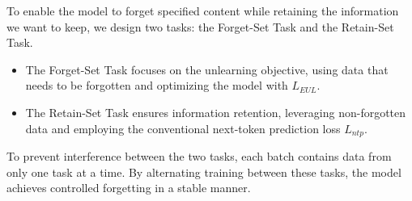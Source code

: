 \documentclass[11pt]{article}
\begin{document}


To enable the model to forget specified content while retaining the information we want to keep, we design two tasks: the Forget-Set Task and the Retain-Set Task.
\begin{itemize}
	\item The Forget-Set Task focuses on the unlearning objective, using data that needs to be forgotten and optimizing the model with $L_{EUL}$.
	\item The Retain-Set Task ensures information retention, leveraging non-forgotten data and employing the conventional next-token prediction loss $L_{ntp}$.
\end{itemize}


To prevent interference between the two tasks, each batch contains data from only one task at a time. By alternating training between these tasks, the model achieves controlled forgetting in a stable manner.
\end{document}
